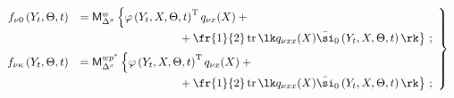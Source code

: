    \begin{equation}

   \left.

   \begin{array}{rl}

   f_{\nu 0} \left(Y_t,\Theta,t\right) &= {\sf M}_{\Delta^x}^{w} \left\{ \varphi

   \left(Y_t,X,\Theta,t\right)^{\mathrm{T}} q_{\nu x} (X) + {}\right.\\[6pt]

   &\left.\displaystyle \hspace*{30mm}{}+\fr{1}{2}\, \mathrm{tr}\,

    \lk q_{\nu xx} (X) \bar\si_0 \left(Y_t,X,\Theta,t\right)\rk\right\} \,; %

\\[6pt]

    f_{\nu \kappa} \left(Y_t,\Theta,t\right) &=

    {\sf M}_{\Delta^x}^{w p^*} \left\{ \varphi\left(Y_t,X,\Theta,t\right)^{\mathrm{T}} q_{\nu x} (X) + {}\right.\\[6pt]

&\left.\displaystyle\hspace*{30mm}{} +   \fr{1}{2}\,\mathrm{tr}\,

    \lk q_{\nu xx} (X) \bar\si_0 \left(Y_t,X,\Theta,t\right)\rk\right\} \,; %

\end{array}

\right\}

    \label{e5.4a-s1}

\end{equation}



\noindent

